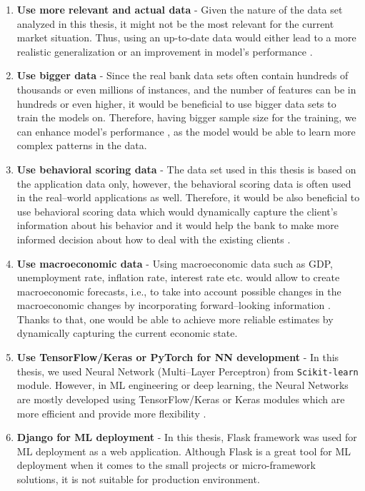 \begin{enumerate}\setlength\itemsep{0em}
    \item \textbf{Use more relevant and actual data} - Given the nature of the data set analyzed in this thesis, it might not be the most relevant for the current market situation. Thus, using an up-to-date data would either lead to a more realistic generalization \citep {kumar2021blockchain} or an improvement in model's performance \citep{karatas2020increasing}.
    \item \textbf{Use bigger data} - Since the real bank data sets often contain hundreds of thousands or even millions of instances, and the number of features can be in hundreds or even higher, it would be beneficial to use bigger data sets to train the models on. Therefore, having bigger sample size for the training, we can enhance model's performance \citep{ng2020influence}, as the model would be able to learn more complex patterns in the data. 
    \item \textbf{Use behavioral scoring data} - The data set used in this thesis is based on the application data only, however, the behavioral scoring data is often used in the real--world applications as well. Therefore, it would be also beneficial to use behavioral scoring data which would dynamically capture the client's information about his behavior and it would help the bank to make more informed decision about how to deal with the existing clients \citep{li2012overview}.
    \item \textbf{Use macroeconomic data} - Using macroeconomic data such as GDP, unemployment rate, inflation rate, interest rate etc. would allow to create macroeconomic  forecasts, i.e., to take into account possible changes in the macroeconomic changes by incorporating forward--looking information \citep{jakubik2007macroeconomic}.
    Thanks to that, one would be able to achieve more reliable estimates by dynamically capturing the current economic state.
    \item \textbf{Use TensorFlow/Keras or PyTorch for NN development} - In this thesis, we used Neural Network (Multi--Layer Perceptron) from \lstinline{Scikit-learn} module. However, in ML engineering or deep learning, the Neural Networks are mostly developed using TensorFlow/Keras or Keras modules which are more efficient and provide more flexibility \citep{gevorkyan2019review}.
    \item \textbf{Django for ML deployment} - In this thesis, Flask framework was used for ML deployment as a web application. Although Flask is a great tool for ML deployment when it comes to the small projects or micro-framework solutions, it is not suitable for production environment.

\end{enumerate}
